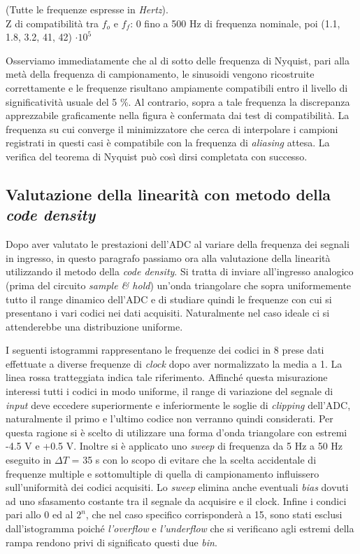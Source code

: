 \documentclass[journal]{IEEEtran}
\begin{document}
(Tutte le frequenze espresse in \textit{Hertz}). \\ Z di compatibilità tra $f_o$ e $f_f$: 0 fino a 500 Hz di frequenza nominale, poi (1.1, 1.8, 3.2, 41, 42) $\cdot 10^5$
\\
\vspace{55 mm}

Osserviamo immediatamente che al di sotto delle frequenza di Nyquist, pari alla metà della frequenza di campionamento, le sinusoidi vengono ricostruite correttamente e le frequenze risultano ampiamente compatibili entro il livello di significatività usuale del 5 \%. Al contrario, sopra a tale frequenza la discrepanza apprezzabile graficamente nella figura è confermata dai test di compatibilità. La frequenza su cui converge il minimizzatore che cerca di interpolare i campioni registrati in questi casi è compatibile con la frequenza di \textit{aliasing} attesa. La verifica del teorema di Nyquist può così dirsi completata con successo.


\subsection{Valutazione della linearità con metodo della \textit{code density}}
Dopo aver valutato le prestazioni dell'ADC al variare della frequenza dei segnali in ingresso, in questo paragrafo passiamo ora alla valutazione della linearità utilizzando il metodo della \textit{code density}. Si tratta di inviare all'ingresso analogico (prima del circuito \textit{sample \& hold}) un'onda triangolare che sopra uniformemente tutto il range dinamico dell'ADC e di studiare quindi le frequenze con cui si presentano i vari codici nei dati acquisiti. Naturalmente nel caso ideale ci si attenderebbe una distribuzione uniforme.

I seguenti istogrammi rappresentano le frequenze dei codici in 8 prese dati effettuate a diverse frequenze di \textit{clock} dopo aver normalizzato la media a 1. La linea rossa tratteggiata indica tale riferimento.
Affinché questa misurazione interessi tutti i codici in modo uniforme, il range di variazione del segnale di \textit{input} deve eccedere superiormente e inferiormente le soglie di \textit{clipping} dell'ADC, naturalmente il primo e l'ultimo codice non verranno quindi considerati. Per questa ragione si è scelto di utilizzare una forma d'onda triangolare con estremi -4.5 V e +0.5 V. Inoltre si è applicato uno \textit{sweep} di frequenza da 5 Hz a 50 Hz eseguito in $\Delta T$ = 35 s
con lo scopo di evitare che la scelta accidentale di frequenze multiple e sottomultiple di quella di campionamento influissero sull'uniformità dei codici acquisiti. Lo \textit{sweep} elimina anche eventuali \textit{bias} dovuti ad uno sfasamento costante tra il segnale da acquisire e il clock.
Infine i condici pari allo 0 ed al $2^n$, che nel caso specifico corrisponderà a 15, sono stati esclusi dall'istogramma poiché \textit{l'overflow} e \textit{l'underflow} che si verificano agli estremi della rampa rendono privi di significato questi due \textit{bin}.
\end{document}
